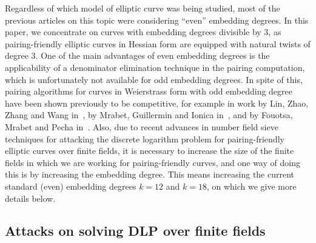 Regardless of which model of elliptic curve was being studied, most of the previous articles on this topic were considering ``even'' embedding degrees. In this paper, we concentrate on curves with embedding degrees divisible by 3, as pairing-friendly elliptic curves in Hessian form are equipped with natural twists of degree 3. One of the main advantages of even embedding degrees is the applicability of a denominator elimination technique in the pairing computation, which is unfortunately not available for odd embedding degrees. In spite of this, pairing algorithms for curves in Weierstrass form with odd embedding degree have been shown previously to be competitive, for example in work by Lin, Zhao, Zhang and Wang in~\cite{2008/lin}, by Mrabet, Guillermin and Ionica in~\cite{2009/deg15}, and by Fouotsa, Mrabet and Pecha in~\cite{2016/degodd}. Also, due to recent advances in number field sieve techniques for attacking the discrete logarithm problem for pairing-friendly elliptic curves over finite fields, it is necessary to increase the size of the finite fields in which we are working for pairing-friendly curves, and one way of doing this is by increasing the embedding degree. This means increasing the current standard (even) embedding degrees $k=12$ and $k=18$, on which we give more details below.




\subsection{Attacks on solving DLP over finite fields}

